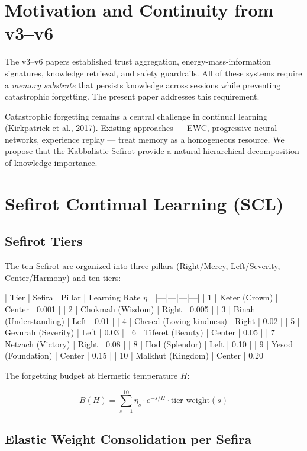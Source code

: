 \documentclass[11pt]{article}
\theoremstyle{plain}
\begin{document}
\section{Motivation and Continuity from v3–v6}

The v3–v6 papers established trust aggregation, energy-mass-information signatures, knowledge retrieval, and safety guardrails. All of these systems require a \emph{memory substrate} that persists knowledge across sessions while preventing catastrophic forgetting. The present paper addresses this requirement.

Catastrophic forgetting remains a central challenge in continual learning (Kirkpatrick et al., 2017). Existing approaches — EWC, progressive neural networks, experience replay — treat memory as a homogeneous resource. We propose that the Kabbalistic Sefirot provide a natural hierarchical decomposition of knowledge importance.


\section{Sefirot Continual Learning (SCL)}

\subsection{Sefirot Tiers}

The ten Sefirot are organized into three pillars (Right/Mercy, Left/Severity, Center/Harmony) and ten tiers:

| Tier | Sefira | Pillar | Learning Rate \( \eta \) |
|—|—|—|—|
| 1 | Keter (Crown) | Center | 0.001 |
| 2 | Chokmah (Wisdom) | Right | 0.005 |
| 3 | Binah (Understanding) | Left | 0.01 |
| 4 | Chesed (Loving-kindness) | Right | 0.02 |
| 5 | Gevurah (Severity) | Left | 0.03 |
| 6 | Tiferet (Beauty) | Center | 0.05 |
| 7 | Netzach (Victory) | Right | 0.08 |
| 8 | Hod (Splendor) | Left | 0.10 |
| 9 | Yesod (Foundation) | Center | 0.15 |
| 10 | Malkhut (Kingdom) | Center | 0.20 |

The forgetting budget at Hermetic temperature \( H \):

\begin{equation}
B(H) = \sum_{s=1}^{10} \eta_s \cdot e^{-s/H} \cdot \text{tier\_weight}(s)
\end{equation}

\subsection{Elastic Weight Consolidation per Sefira}
\end{document}
